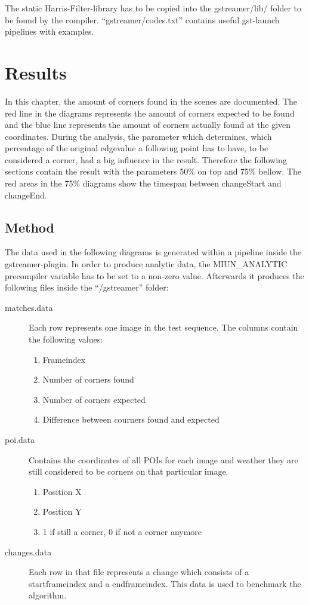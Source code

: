 The static Harris-Filter-library has to be copied into the gstreamer/lib/ folder to be found by the compiler. \enquote{gstreamer/codes.txt} contains useful gst-launch pipelines with examples.

\chapter{Results}
In this chapter, the amount of corners found in the scenes are documented. The red line in the diagrams represents the amount of corners expected to be found and the blue line represents the amount of corners actually found at the given coordinates. During the analysis, the parameter which determines, which percentage of the original edgevalue a following point has to have, to be considered a corner, had a big influence in the result. Therefore the following sections contain the result with the parameters 50\% on top and 75\% bellow. The red areas in the 75\% diagrams show the timespan between changeStart and changeEnd.

\section{Method}
The data used in the following diagrams is generated within a pipeline inside the gstreamer-plugin. In order to produce analytic data, the MIUN\_ANALYTIC precompiler variable has to be set to a non-zero value. Afterwards it produces the following files inside the \enquote{/gstreamer} folder:
\begin{description}
	\item[matches.data] 
	Each row represents one image in the test sequence. The columns contain the following values:
	\begin{enumerate}
			\item{Frameindex}
			\item{Number of corners found}
			\item{Number of corners expected}
			\item{Difference between courners found and expected}
	\end{enumerate}
	\item[poi.data] 
		Contains the coordinates of all POIs for each image and weather they are still considered to be corners on that particular image.
			\begin{enumerate}
			\item{Position X}
			\item{Position Y}
			\item{1 if still a corner, 0 if not a corner anymore}
		\end{enumerate}
		 
	\item[changes.data] 
		Each row in that file represents a change which consists of a startframeindex and a endframeindex. This data is used to benchmark the algorithm.
\end{description}

